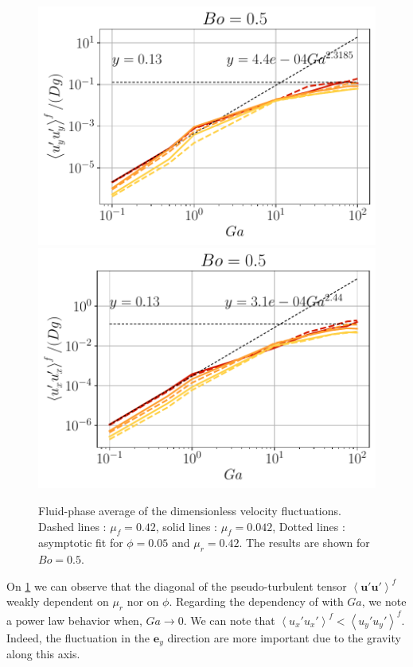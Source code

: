 \begin{figure}[h!]
    \centering
    \includegraphics[height=0.22\textheight]{image/N_10/UU/UU_fyy_Bo_0_5.pdf}
    \includegraphics[height=0.22\textheight]{image/N_10/UU/UU_fxx_Bo_0_5.pdf}
    \caption{Fluid-phase average of the dimensionless velocity fluctuations. Dashed lines : $\mu_f = 0.42$, solid lines : $\mu_f = 0.042$, Dotted lines : asymptotic fit for $\phi = 0.05$ and $\mu_r = 0.42$. The results are shown for $Bo = 0.5$.} 
    \label{fig:UUf}
\end{figure} 
On \ref{fig:UUf} we can observe that the diagonal of the pseudo-turbulent tensor $\left<\bm{u'u'}\right>^f$ weakly dependent on $\mu_r$ nor on $\phi$.
Regarding the dependency of  with $Ga$, we note a power law behavior when, $Ga \rightarrow 0$. 
We can note that $\left<{u_x'u_x'}\right>^f  < \left<{u_y'u_y'}\right>^f$.
Indeed, the fluctuation in the $\bm{e}_y$ direction are more important due to the gravity along this axis.  


